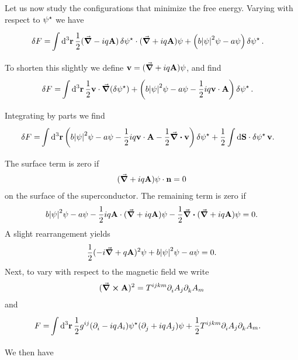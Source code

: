 Let us now study the configurations that minimize the free energy. Varying with respect to $\psi^{\star}$ we have
\begin{align*}
	\var{F} =& \int\limits_{}^{}\dd[3]{\vb{r}}\frac{1}{2}(\grad{} - iq\vb{A})\var{\psi\ensuremath{^{\star}}}\cdot(\grad{} + iq\vb{A})\psi + \left(b\abs{\psi}^{2}\psi - a\psi\right)\var{\psi\ensuremath{^{\star}}}.
\end{align*}
To shorten this slightly we define $\vb{v} = (\grad{} + iq\vb{A})\psi$, and find
\begin{align*}
	\var{F} =& \int\limits_{}^{}\dd[3]{\vb{r}}\frac{1}{2}\vb{v}\cdot\grad(\var{\psi\ensuremath{^{\star}}}) + \left(b\abs{\psi}^{2}\psi - a\psi - \frac{1}{2}iq\vb{v}\cdot\vb{A}\right)\var{\psi\ensuremath{^{\star}}}.
\end{align*}
Integrating by parts we find
\begin{align*}
	\var{F} =& \int\limits_{}^{}\dd[3]{\vb{r}}\left(b\abs{\psi}^{2}\psi - a\psi - \frac{1}{2}iq\vb{v}\cdot\vb{A} - \frac{1}{2}\div{\vb{v}}\right)\var{\psi\ensuremath{^{\star}}} + \frac{1}{2}\int\limits_{}^{}\dd{\vb{S}}\cdot\var{\psi\ensuremath{^{\star}}}\vb{v}.
\end{align*}
The surface term is zero if
\begin{align*}
	(\grad{} + iq\vb{A})\psi\cdot\vb{n} = 0
\end{align*}
on the surface of the superconductor. The remaining term is zero if
\begin{align*}
	b\abs{\psi}^{2}\psi - a\psi - \frac{1}{2}iq\vb{A}\cdot(\grad{} + iq\vb{A})\psi - \frac{1}{2}\div{(\grad{} + iq\vb{A})\psi} = 0.
\end{align*}
A slight rearrangement yields
\begin{align*}
	\frac{1}{2}(-i\grad{} + q\vb{A})^{2}\psi + b\abs{\psi}^{2}\psi - a\psi = 0.
\end{align*}
Next, to vary with respect to the magnetic field we write
\begin{align*}
	(\curl{\vb{A}})^{2} = T^{ijkm}\partial^{}_{i}A_{j}\partial^{}_{k}A_{m}
\end{align*}
and
\begin{align*}
	F =& \int\limits_{}^{}\dd[3]{\vb{r}}\frac{1}{2}g^{ij}(\partial^{}_{i} - iqA_{i})\psi^{\star}(\partial^{}_{j} + iqA_{j})\psi + \frac{1}{2}T^{ijkm}\partial^{}_{i}A_{j}\partial^{}_{k}A_{m}.
\end{align*}
We then have
